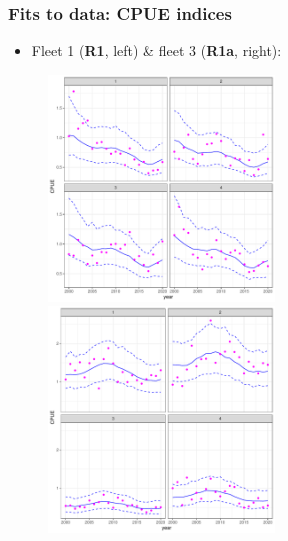\documentclass{beamer}
\begin{document}
\begin{frame}
    \frametitle{Fits to data: CPUE indices}
\begin{itemize}
    \item Fleet 1 (\textbf{R1}, left) \& fleet 3 (\textbf{R1a}, right):
\end{itemize}
\vspace{0.25cm}
\begin{figure}
\begin{center}
        \includegraphics[width=6cm,height=6cm]{figs/case4_cpuefits.pdf}\includegraphics[width=6cm,height=6cm]{figs/case4a_cpuefits.pdf}
    \end{center}
\end{figure}
\end{frame}
\end{document}
